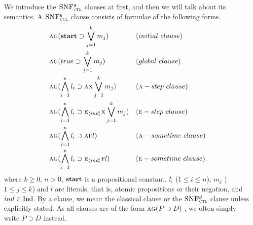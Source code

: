 \documentclass[letterpaper]{article}
\begin{document}

We introduce the ${\textsc{SNF}_{\textsc{ctl}}^g}$ clauses at first, and then we will talk about its semantics. A ${\textsc{SNF}_{\textsc{ctl}}^g}$ clause consists of formulae of the following forms.
\begin{align*}
& \ALL \GLOBAL(\start \supset \bigvee_{j=1}^k m_j) && (initial\ clause) \\
& \ALL \GLOBAL(true \supset \bigvee_{j=1}^k m_j) && (global\ clause) \\
& \ALL \GLOBAL(\bigwedge_{i=1}^n l_i \supset \ALL \NEXT \bigvee_{j=1}^k m_j) && (\ALL-step\ clause)\\
& \ALL \GLOBAL(\bigwedge_{i=1}^n l_i \supset \EXIST_\tuple{ind} \NEXT \bigvee_{j=1}^k m_j) && (\EXIST-step\ clause)\\
& \ALL \GLOBAL(\bigwedge_{i=1}^n l_i \supset \ALL \FUTURE l) && (\ALL-sometime\ clause)\\
& \ALL \GLOBAL(\bigwedge_{i=1}^n l_i \supset \EXIST_{\tuple{ind}} \FUTURE l) && (\EXIST-sometime\ clause).
\end{align*}
where $k \ge 0$, $n > 0$, $\textbf{start}$ is a propositional constant, $l_i$ ($1 \le i \le n$), $m_j$ ($1 \le j \le k$) and $l$ are literals, that is, atomic propositions or their negation, and $ind\in \textrm{Ind}$. %
By a clause, we mean the classical clause or the ${\textsc{SNF}_{\textsc{ctl}}^g}$ clause unless explicitly stated.
As all clauses are of the form $\textsc{a} \textsc{g}(P \supset D)$ , we often simply write $P \supset D$ instead.
\end{document}
